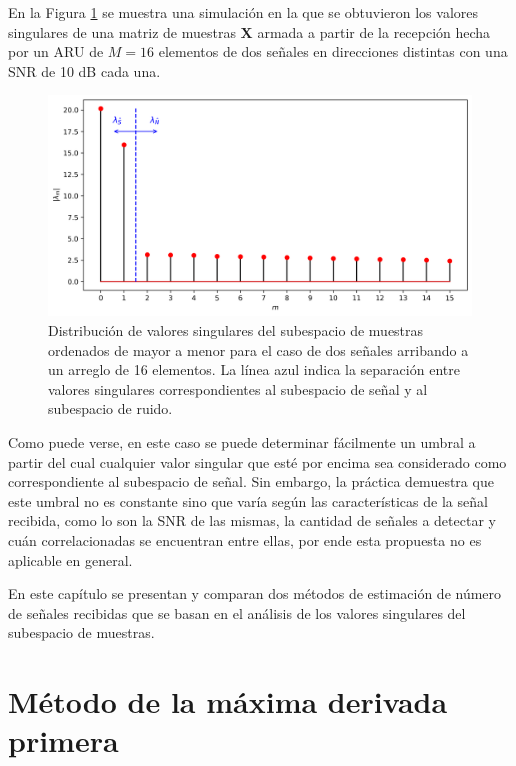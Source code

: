 En la Figura \ref{fig:ml_aval} se muestra una simulación en la que se obtuvieron los valores singulares de una matriz de muestras $\mathbf{X}$ armada a partir de la recepción hecha por un ARU de $M=16$ elementos de dos señales en direcciones distintas con una SNR de 10 dB cada una.
\begin{figure}[ht!]
  \centering
  \includegraphics[width=0.9\linewidth]{images/05-Machine Learning/ml_aval.png}
  \caption{Distribución de valores singulares del subespacio de muestras ordenados de mayor a menor para el caso de dos señales arribando a un arreglo de 16 elementos. La línea azul indica la separación entre valores singulares correspondientes al subespacio de señal y al subespacio de ruido.}
  \label{fig:ml_aval}
\end{figure}
Como puede verse, en este caso se puede determinar fácilmente un umbral a partir del cual cualquier valor singular que esté por encima sea considerado como correspondiente al subespacio de señal. Sin embargo, la práctica demuestra que este umbral no es constante sino que varía según las características de la señal recibida, como lo son la SNR de las mismas, la cantidad de señales a detectar y cuán correlacionadas se encuentran entre ellas, por ende esta propuesta no es aplicable en general.

En este capítulo se presentan y comparan dos métodos de estimación de número de señales recibidas que se basan en el análisis de los valores singulares del subespacio de muestras.


\section{Método de la máxima derivada primera}

